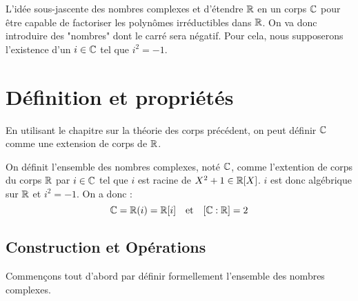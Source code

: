 
L'idée sous-jascente des nombres complexes et d'étendre $\mathbb{R}$ en un corps $\mathbb{C}$ pour être capable de factoriser les polynômes 
irréductibles dans $\mathbb{R}$. On va donc introduire des "nombres" dont le carré sera négatif. 
Pour cela, nous supposerons l'existence d'un $i \in \mathbb{C}$ tel que $i^2 = -1$. 

\minitoc  %


\section{Définition et propriétés}

En utilisant le chapitre sur la théorie des corps précédent, on peut définir $\mathbb{C}$ comme une extension de corps de $\mathbb{R}$. 

\begin{definition}
    On définit l'ensemble des nombres complexes, noté $\mathbb{C}$, comme l'extention de corps du corps $\mathbb{R}$ par $i \in \mathbb{C}$ 
    tel que $i$ est racine de $X^2+1 \in \mathbb{R}[X]$. $i$ est donc algébrique sur $\mathbb{R}$ et $i^2 = -1$. 
    On a donc : 
        \[ \mathbb{C} = \mathbb{R}(i) = \mathbb{R}[i] \quad \text{et} \quad [\mathbb{C} : \mathbb{R}] = 2\]
\end{definition}

\subsection{Construction et Opérations}

Commençons tout d'abord par définir formellement l'ensemble des nombres complexes. 

